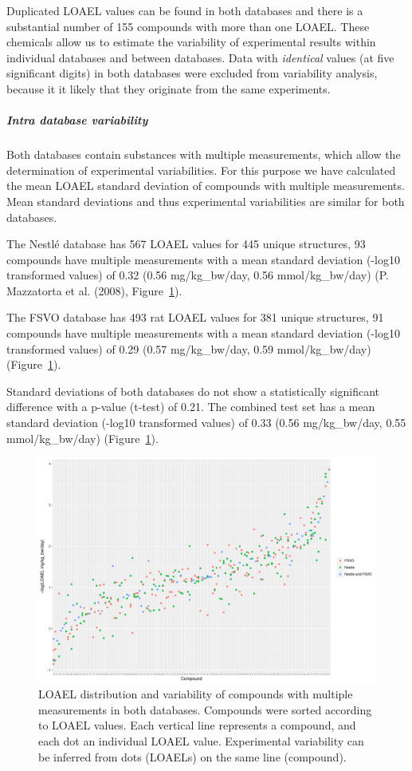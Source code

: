 \documentclass[]{achemso}
\let\oldsubparagraph\subparagraph
\renewcommand{\subparagraph}[1]{\oldsubparagraph{#1}\mbox{}}
\begin{document}
Duplicated LOAEL values can be found in both databases and there is a
substantial number of 155 compounds with more than one LOAEL. These
chemicals allow us to estimate the variability of experimental results
within individual databases and between databases. Data with
\emph{identical} values (at five significant digits) in both databases
were excluded from variability analysis, because it it likely that they
originate from the same experiments.

\subparagraph{Intra database
variability}\label{intra-database-variability}

Both databases contain substances with multiple measurements, which
allow the determination of experimental variabilities. For this purpose
we have calculated the mean LOAEL standard deviation of compounds with
multiple measurements. Mean standard deviations and thus experimental
variabilities are similar for both databases.

The Nestlé database has 567 LOAEL values for 445 unique structures, 93
compounds have multiple measurements with a mean standard deviation
(-log10 transformed values) of 0.32 (0.56 mg/kg\_bw/day, 0.56
mmol/kg\_bw/day) (P. Mazzatorta et al. (2008), Figure~\ref{fig:intra}).

The FSVO database has 493 rat LOAEL values for 381 unique structures, 91
compounds have multiple measurements with a mean standard deviation
(-log10 transformed values) of 0.29 (0.57 mg/kg\_bw/day, 0.59
mmol/kg\_bw/day) (Figure~\ref{fig:intra}).

Standard deviations of both databases do not show a statistically
significant difference with a p-value (t-test) of 0.21. The combined
test set has a mean standard deviation (-log10 transformed values) of
0.33 (0.56 mg/kg\_bw/day, 0.55 mmol/kg\_bw/day)
(Figure~\ref{fig:intra}).

\begin{figure}
\centering
\includegraphics{figures/dataset-variability.pdf}
\caption{LOAEL distribution and variability of compounds with multiple
measurements in both databases. Compounds were sorted according to LOAEL
values. Each vertical line represents a compound, and each dot an
individual LOAEL value. Experimental variability can be inferred from
dots (LOAELs) on the same line (compound).}\label{fig:intra}
\end{figure}
\end{document}
